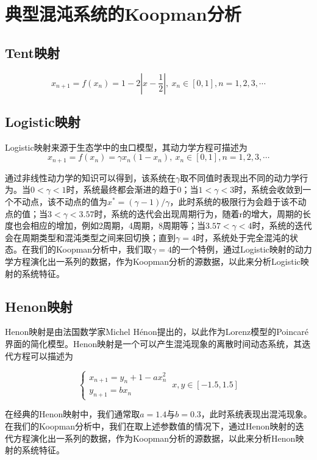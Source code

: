 \chapter{典型混沌系统的Koopman分析}

\section{Tent映射}
\begin{equation}
    x_{n+1}=f(x_n)=1-2|x-\frac{1}{2}| ,\ x_n\in [0,1], n=1,2,3,\cdots
\end{equation}

\section{Logistic映射}
Logistic映射来源于生态学中的虫口模型，其动力学方程可描述为
\begin{equation}
    x_{n+1}=f(x_n)=\gamma x_n(1-x_n),\ x_n\in [0,1], n=1,2,3,\cdots
\end{equation}

通过非线性动力学的知识可以得到，该系统在$\gamma$取不同值时表现出不同的动力学行为。当$0<\gamma<1$时，系统最终都会渐进的趋于0；当$1<\gamma<3$时，系统会收敛到一个不动点，该不动点的值为$x^*=(\gamma-1)/\gamma$，此时系统的极限行为会趋于该不动点的值；当$3<\gamma<3.57$时，系统的迭代会出现周期行为，随着r的增大，周期的长度也会相应的增加，例如2周期，4周期，8周期等；当$3.57<\gamma<4$时，系统的迭代会在周期类型和混沌类型之间来回切换；直到$\gamma=4$时，系统处于完全混沌的状态。在我们的Koopman分析中，我们取$\gamma=4$的一个特例，通过Logistic映射的动力学方程演化出一系列的数据，作为Koopman分析的源数据，以此来分析Logistic映射的系统特征。

\section{Henon映射}
Henon映射是由法国数学家Michel H\'{e}non提出的，以此作为Lorenz模型的Poincar\'{e}界面的简化模型。Henon映射是一个可以产生混沌现象的离散时间动态系统，其迭代方程可以描述为

\begin{equation}
    \begin{cases}
        x_{n+1}=y_n+1-ax_n^2\\
        y_{n+1}=bx_n
    \end{cases}\ x,y\in [-1.5,1.5]
\end{equation}

在经典的Henon映射中，我们通常取$a=1.4$与$b=0.3$，此时系统表现出混沌现象。在我们的Koopman分析中，我们在取上述参数值的情况下，通过Henon映射的迭代方程演化出一系列的数据，作为Koopman分析的源数据，以此来分析Henon映射的系统特征。


